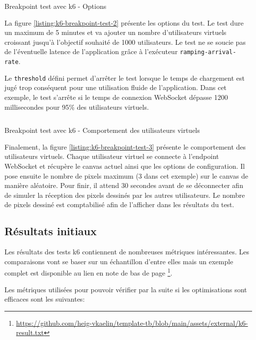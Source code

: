 \begin{listing}[H]
  \inputminted{ts}{assets/figures/breakpoint-test-2.ts}
  \caption{Breakpoint test avec k6 - Options}
  \label{listing:k6-breakpoint-test-2}
\end{listing}

La figure \ref{listing:k6-breakpoint-test-2} présente les options du test. Le test dure un maximum de 5 minutes et va ajouter un nombre d'utilisateurs virtuels croissant jusqu'à l'objectif souhaité de 1000 utilisateurs. Le test ne se soucie pas de l'éventuelle latence de l'application grâce à l'exécuteur \texttt{ramping-arrival-rate}.

Le \texttt{threshold} défini permet d'arrêter le test lorsque le temps de chargement est jugé trop conséquent pour une utilisation fluide de l'application. Dans cet exemple, le test s'arrête si le temps de connexion WebSocket dépasse 1200 millisecondes pour 95\% des utilisateurs virtuels.

\begin{listing}[H]
  \inputminted{ts}{assets/figures/breakpoint-test-3.ts}
  \caption{Breakpoint test avec k6 - Comportement des utilisateurs virtuels}
  \label{listing:k6-breakpoint-test-3}
\end{listing}

Finalement, la figure \ref{listing:k6-breakpoint-test-3} présente le comportement des utilisateurs virtuels. Chaque utilisateur virtuel se connecte à l'endpoint WebSocket et récupère le canvas actuel ainsi que les options de configuration. Il pose ensuite le nombre de pixels maximum (3 dans cet exemple) sur le canvas de manière aléatoire. Pour finir, il attend 30 secondes avant de se déconnecter afin de simuler la réception des pixels dessinés par les autres utilisateurs. Le nombre de pixels dessiné est comptabilisé afin de l'afficher dans les résultats du test.

\subsection{Résultats initiaux}

Les résultats des tests k6 contiennent de nombreuses métriques intéressantes. Les comparaisons vont se baser sur un échantillon d'entre elles mais un exemple complet est disponible au lien en note de bas de page \footnote{\url{https://github.com/heig-vkaelin/template-tb/blob/main/assets/external/k6-result.txt}}.

Les métriques utilisées pour pouvoir vérifier par la suite si les optimisations sont efficaces sont les suivantes:

